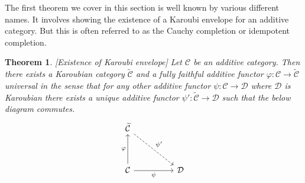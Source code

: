 \documentclass[12pt]{article}
\numberwithin{equation}{section}
\newcounter{dummy} \numberwithin{dummy}{section}
\newtheorem{theorem}[dummy]{Theorem}
\begin{document}
	The first theorem we cover in this section is well known by various different names. It involves showing the existence of a Karoubi envelope for an additive category. But this is often referred to as the Cauchy completion or idempotent completion.
	\begin{theorem}\label{thm:pseudoabelian}[Existence of Karoubi envelope]
		Let $\mathcal{C}$ be an additive category. Then there exists a Karoubian category $\widetilde{\mathcal{C}}$ and a fully faithful additive functor $\varphi:\mathcal{C} \to \widetilde{\mathcal{C}}$ universal in the sense that for any other additive functor $\psi: \mathcal{C} \to \mathcal{D}$ where $\mathcal{D}$ is Karoubian there exists a unique additive functor ${\psi'}: \widetilde{\mathcal{C}} \to \mathcal{D} $ such that the below diagram commutes.
		\[\begin{tikzcd}
			{\widetilde{\mathcal{C}}} \\
			\\
			{\mathcal{C}} && {\mathcal{D}}
			\arrow["{\psi'}",dashed, from=1-1, to=3-3]
			\arrow["\varphi", from=3-1, to=1-1]
			\arrow["\psi"',from=3-1, to=3-3]
		\end{tikzcd}\]
	\end{theorem}
\end{document}
